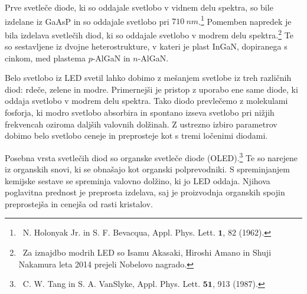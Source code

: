 Prve svetleče diode, ki so oddajale svetlobo v vidnem delu spektra,
so bile izdelane iz GaAsP in so oddajale 
svetlobo pri $710~\si{nm}$.\footnote{~N. Holonyak Jr. in S. F. Bevacqua, Appl. Phys. Lett.
${\mathbf 1}$, 82 (1962).} Pomemben
napredek je bila izdelava svetlečih diod, ki so oddajale svetlobo v modrem delu 
spektra.\footnote{~Za iznajdbo modrih LED so Isamu Akasaki, Hiroshi Amano in 
Shuji Nakamura leta 2014 prejeli Nobelovo nagrado.} Te so sestavljene iz dvojne
heterostrukture, v kateri je plast InGaN, dopiranega s cinkom, 
med plastema $p$-AlGaN in $n$-AlGaN.

Belo svetlobo iz LED svetil lahko dobimo z mešanjem svetlobe iz treh različnih 
diod: rdeče, zelene in modre. Primernejši je pristop z uporabo ene same diode, 
ki oddaja svetlobo v modrem delu spektra. Tako diodo prevlečemo z molekulami fosforja, ki
modro svetlobo absorbira in spontano izseva svetlobo pri nižjih frekvencah 
oziroma daljših valovnih dolžinah. Z ustrezno izbiro parametrov dobimo belo svetlobo
ceneje in preprosteje kot s tremi ločenimi diodami. 

\begin{remark}
Posebna vrsta svetlečih diod so organske svetleče diode (OLED).\footnote{~C. W. Tang in
S. A. VanSlyke, Appl. Phys. Lett. $\mathbf{51}$, 913 (1987).} Te so narejene iz
organskih snovi, ki se obnašajo kot organski polprevodniki. S spreminjanjem kemijske
sestave se spreminja valovno dolžino, ki jo LED oddaja. Njihova poglavitna prednost
je preprosta izdelava, saj je proizvodnja organskih spojin preprostejša in cenejša
od rasti kristalov. 
\end{remark}
